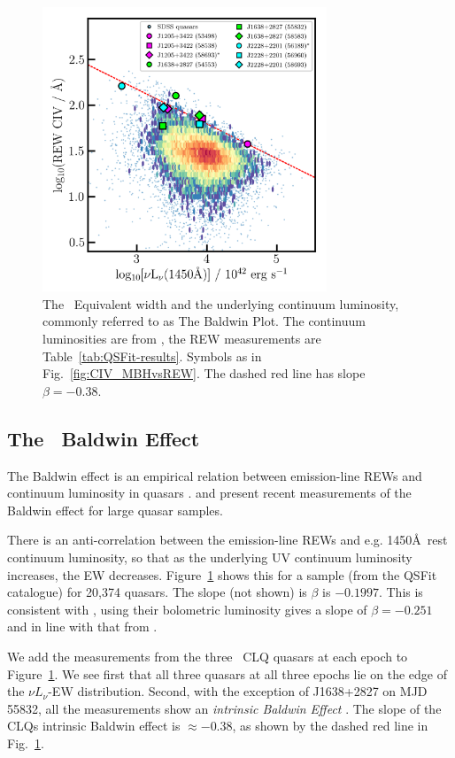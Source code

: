\documentclass[fleqn,usenatbib]{mnras}
\begin{document}
\begin{figure}
  \centering
  \includegraphics[width=8.5cm, trim=0.2cm 0.2cm 0.0cm 0.2cm, clip]
  {figures/CIV_CLQs_Baldwin_20191130.png}
   \vspace{-12pt}
   \caption[]{The \civ\ Equivalent width and the underlying continuum luminosity,
     commonly referred to as The Baldwin Plot.
     The continuum luminosities are  from \citet{Calderone2017},
     the REW measurements are Table~\ref{tab:QSFit-results}.
     Symbols as in Fig.~\ref{fig:CIV_MBHvsREW}.
     The dashed red line has slope $\beta=-0.38$.}
  \label{fig:CIV_Baldwin}
\end{figure}
\subsection{The \civ\ Baldwin Effect}
The Baldwin effect \citep{Baldwin1977} is an empirical 
relation between emission-line REWs and continuum luminosity in
quasars \citep[][]{Shields2007, Hamann2017, Calderone2017}.
\citet{Hamann2017} and \citet{Calderone2017} present recent
measurements of the Baldwin effect for large quasar samples. 

There is an anti-correlation between the emission-line REWs and
e.g. 1450\AA\ rest continuum luminosity, so that as the underlying UV
continuum luminosity increases, the EW decreases. 
Figure~\ref{fig:CIV_Baldwin} shows this for a sample (from the QSFit catalogue)
for 20,374 quasars.  The slope (not shown) is $\beta$ is $-0.1997$.
This is consistent with \citet{Kozlowski2017}, using their bolometric
luminosity gives a slope of $\beta=-0.251$ and in line with that from
\citet[][ $\beta=-0.23$]{Hamann2017}.

We add the measurements from the three \civ\ CLQ quasars at each epoch
to Figure~\ref{fig:CIV_Baldwin}. We see first that all three quasars
at all three epochs lie on the edge of the $\nu L_{\nu}$-EW
distribution.  Second, with the exception of J1638+2827 on MJD 55832,
all the measurements show an {\it intrinsic Baldwin Effect}
\citep[e.g.][]{Goad2004, Rakic2017}.  The slope of the CLQs intrinsic
Baldwin effect is $\approx-0.38$, as shown by the dashed red line in
Fig.~\ref{fig:CIV_Baldwin}.
\end{document}
